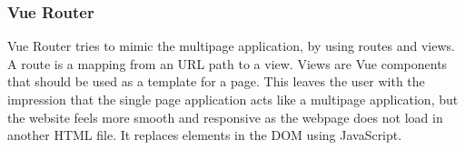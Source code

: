 \subsubsection{Vue Router}
Vue Router\cite{VUEROUTER} tries to mimic the multipage application, by using routes and views. A route is a mapping from an URL path to a view. Views are Vue components that should be used as a template for a page. This leaves the user with the impression that the single page application acts like a multipage application, but the website feels more smooth and responsive as the webpage does not load in another HTML file. It replaces elements in the DOM using JavaScript.